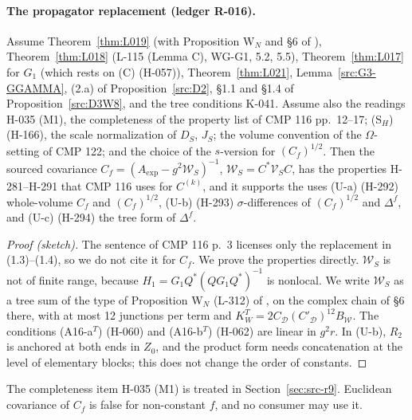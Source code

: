 \paragraph{The propagator replacement (ledger R-016).}
\begin{theorem}\label{thm:L035}
Assume Theorem~\ref{thm:L019} (with Proposition W$_N$ and \S6 of ), Theorem~\ref{thm:L018} (L-115 (Lemma C), WG-G1, 5.2, 5.5), Theorem~\ref{thm:L017} for $G_1$ (which rests on (C) (H-057)), Theorem~\ref{thm:L021}, Lemma~\ref{src:G3-GGAMMA}, (2.a) of Proposition~\ref{src:D2}, \S1.1 and \S1.4 of Proposition~\ref{src:D3W8}, and the tree conditions K-041. Assume also the readings H-035 (M1), the completeness of the property list of CMP 116 pp.~12--17; (S$_H$) (H-166), the scale normalization of $D_S$, $J_S$; the volume convention of the $\Omega$-setting of CMP 122; and the choice of the $s$-version for $(C_f)^{1/2}$. Then the sourced covariance $C_f=(A_{\exp}-g^2\mathcal W_S)^{-1}$, $\mathcal W_S=C^*\mathcal V_SC$, has the properties H-281--H-291 that CMP 116 uses for $C^{(k)}$, and it supports the uses (U-a) (H-292) whole-volume $C_f$ and $(C_f)^{1/2}$, (U-b) (H-293) $\sigma$-differences of $(C_f)^{1/2}$ and $\Delta^f$, and (U-c) (H-294) the tree form of $\Delta^f$.
\end{theorem}
\begin{proof}[Proof (sketch)]
The sentence of CMP 116 p.~3 licenses only the replacement in (1.3)--(1.4), so we do not cite it for $C_f$. We prove the properties directly. $\mathcal W_S$ is not of finite range, because $H_1=G_1Q^*(QG_1Q^*)^{-1}$ is nonlocal. We write $\mathcal W_S$ as a tree sum of the type of Proposition W$_N$ (L-312) of , on the complex chain of \S6 there, with at most 12 junctions per term and $K_W^T=2C_{\mathcal D}(C'_{\mathcal D})^{12}B_{\mathcal W}$. The conditions (A16-a$^T$) (H-060) and (A16-b$^T$) (H-062) are linear in $g^2r$. In (U-b), $R_2$ is anchored at both ends in $Z_0$, and the product form needs concatenation at the level of elementary blocks; this does not change the order of constants.
\end{proof}
The completeness item H-035 (M1) is treated in Section~\ref{sec:src-r9}. Euclidean covariance of $C_f$ is false for non-constant $f$, and no consumer may use it.

